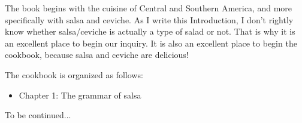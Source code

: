 \documentclass{article}
\begin{document}
The book begins with the cuisine of Central and Southern America, and more specifically with salsa and ceviche. As I write this Introduction, I don't rightly know whether salsa/ceviche is actually a type of salad or not. That is why it is an excellent place to begin our inquiry. It is also an excellent place to begin the cookbook, because salsa and ceviche are delicious!

The cookbook is organized as follows: \begin{itemize}
    \item Chapter 1: The grammar of salsa
\end{itemize}

To be continued...
\end{document}
